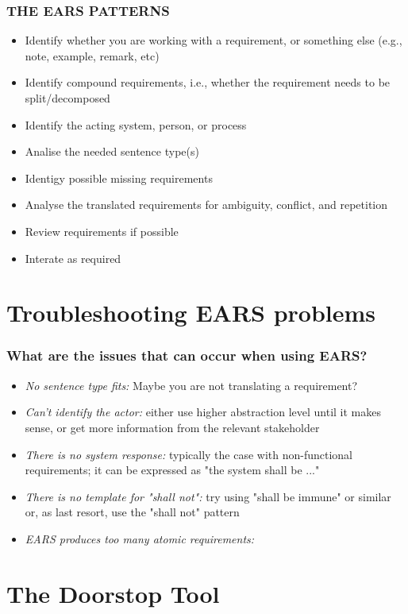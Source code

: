 \documentclass[aspectratio=169]{beamer}
\begin{document}
\begin{frame}[fragile]
  \frametitle{THE EARS PATTERNS}
  \begin{itemize}
  \item Identify whether you are working with a requirement, or something else (e.g., note, example, remark, etc)
  \item Identify compound requirements, i.e., whether the requirement needs to be split/decomposed 
  \item Identify the acting system, person, or process
  \item Analise the needed sentence type(s)
  \item Identigy possible missing requirements
  \item Analyse the translated requirements for ambiguity, conflict, and repetition
  \item Review requirements if possible
  \item Interate as required
  \end{itemize}

\end{frame}

\section*{Troubleshooting EARS problems}

\begin{frame}
  \frametitle{What are the issues that can occur when using EARS?}
  \begin{itemize}
  \item {\it No sentence type fits:} Maybe you are not translating a requirement?
  \item {\it Can't identify the actor:} either use higher abstraction level until it makes sense, or get more information from the relevant stakeholder
  \item {\it There is no system response:}  typically the case with non-functional requirements; it can be expressed as "the system shall be ..."
  \item {\it There is no template for "shall not":} try using "shall be immune" or similar or, as last resort, use the "shall not" pattern
  \item {\it EARS produces too many atomic requirements:} 
  \end{itemize}
  
\end{frame}

\section*{The Doorstop Tool}
\end{document}
